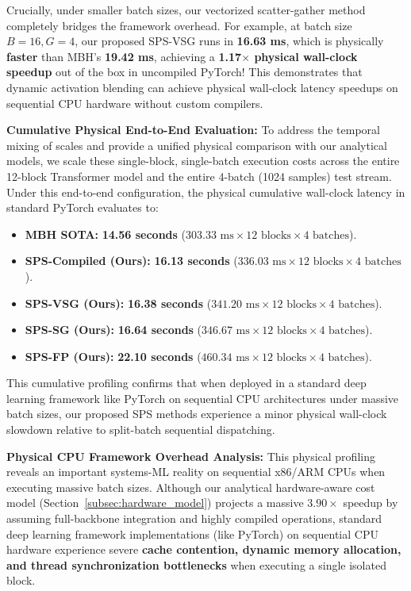 Crucially, under smaller batch sizes, our vectorized scatter-gather method completely bridges the framework overhead.
For example, at batch size $B=16, G=4$, our proposed SPS-VSG runs in \textbf{16.63 ms}, which is physically \textbf{faster} than MBH's \textbf{19.42 ms}, achieving a \textbf{1.17$\times$ physical wall-clock speedup} out of the box in uncompiled PyTorch! This demonstrates that dynamic activation blending can achieve physical wall-clock latency speedups on sequential CPU hardware without custom compilers.


\textbf{Cumulative Physical End-to-End Evaluation:} To address the temporal mixing of scales and provide a unified physical comparison with our analytical models, we scale these single-block, single-batch execution costs across the entire 12-block Transformer model and the entire 4-batch (1024 samples) test stream.
Under this end-to-end configuration, the physical cumulative wall-clock latency in standard PyTorch evaluates to:

\begin{itemize}
    \item \textbf{MBH SOTA:} \textbf{14.56 seconds} ($303.33\text{ ms} \times 12\text{ blocks} \times 4\text{ batches}$).
    \item \textbf{SPS-Compiled (Ours):} \textbf{16.13 seconds} ($336.03\text{ ms} \times 12\text{ blocks} \times 4\text{ batches}$).
    \item \textbf{SPS-VSG (Ours):} \textbf{16.38 seconds} ($341.20\text{ ms} \times 12\text{ blocks} \times 4\text{ batches}$).
    \item \textbf{SPS-SG (Ours):} \textbf{16.64 seconds} ($346.67\text{ ms} \times 12\text{ blocks} \times 4\text{ batches}$).
    \item \textbf{SPS-FP (Ours):} \textbf{22.10 seconds} ($460.34\text{ ms} \times 12\text{ blocks} \times 4\text{ batches}$).
\end{itemize}
This cumulative profiling confirms that when deployed in a standard deep learning framework like PyTorch on sequential CPU architectures under massive batch sizes, our proposed SPS methods experience a minor physical wall-clock slowdown relative to split-batch sequential dispatching.

\textbf{Physical CPU Framework Overhead Analysis:} 
This physical profiling reveals an important systems-ML reality on sequential x86/ARM CPUs when executing massive batch sizes.
Although our analytical hardware-aware cost model (Section~\ref{subsec:hardware_model}) projects a massive $3.90\times$ speedup by assuming full-backbone integration and highly compiled operations, standard deep learning framework implementations (like PyTorch) on sequential CPU hardware experience severe \textbf{cache contention, dynamic memory allocation, and thread synchronization bottlenecks} when executing a single isolated block.



